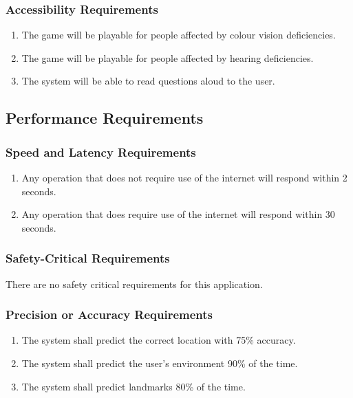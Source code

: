 \documentclass[titlepage]{article}
\begin{document}
		\subsubsection{Accessibility Requirements}
		\label{ssub:accessibility_requirements}
		\begin{enumerate}[{UH}1. ]
			\item 
			The game will be playable for people affected by colour vision deficiencies.
			\item
			The game will be playable for people affected by hearing deficiencies.
			\item
			The system will be able to read questions aloud to the user.
		\end{enumerate}
		
		
		\subsection{Performance Requirements}
		\label{sub:performance_requirements}
		
		
		\subsubsection{Speed and Latency Requirements}
		\label{ssub:speed_and_latency_requirements}
		\begin{enumerate}
			\item
			Any operation that does not require use of the internet will respond within 2 seconds.
			\item
			Any operation that does require use of the internet will respond within 30 seconds.
		\end{enumerate}
		
		\subsubsection{Safety-Critical Requirements}
		\label{ssub:safety_critical_requirements}
		There are no safety critical requirements for this application.
		
		\subsubsection{Precision or Accuracy Requirements}
		\label{ssub:precision_or_accuracy_requirements}
		\begin{enumerate}
			\item
			The system shall predict the correct location with 75\% accuracy.
			\item
			The system shall predict the user's environment 90\% of the time.
			\item
			The system shall predict landmarks 80\% of the time.
		\end{enumerate}
		
\end{document}
